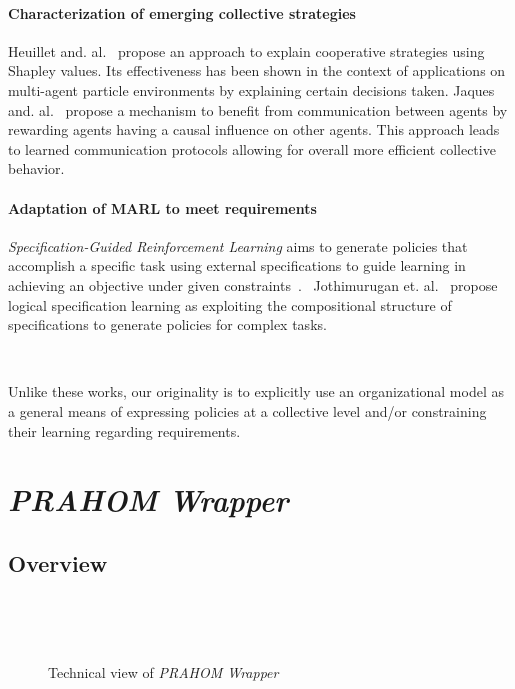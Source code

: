 \documentclass[doubleblind]{ecai}
\begin{document}
\paragraph{\textbf{Characterization of emerging collective strategies}}
%
Heuillet and. al.~\cite{Heuillet2022} propose an approach to explain cooperative strategies using Shapley values. Its effectiveness has been shown in the context of applications on multi-agent particle environments by explaining certain decisions taken.
%
Jaques and. al.~\cite{Jaques2019} propose a mechanism to benefit from communication between agents by rewarding agents having a causal influence on other agents. This approach leads to learned communication protocols allowing for overall more efficient collective behavior.

\paragraph{\textbf{Adaptation of MARL to meet requirements}}
%
\emph{Specification-Guided Reinforcement Learning} aims to generate policies that accomplish a specific task using external specifications to guide learning in achieving an objective under given constraints~\cite{Bansal2022}.%
%
~Jothimurugan et. al.~\cite{Jothimurugan2021} propose logical specification learning as exploiting the compositional structure of specifications to generate policies for complex tasks.

\

Unlike these works, our originality is to explicitly use an organizational model as a general means of expressing policies at a collective level and/or constraining their learning regarding requirements.



\section{\emph{PRAHOM Wrapper}}

\subsection{Overview}

\begin{figure}[h!]
\centering

\caption{Technical view of \emph{PRAHOM Wrapper}}
\label{fig:prahom_wrapper_technical_view}

\

\phantom{X}

\

\end{figure}
\end{document}
